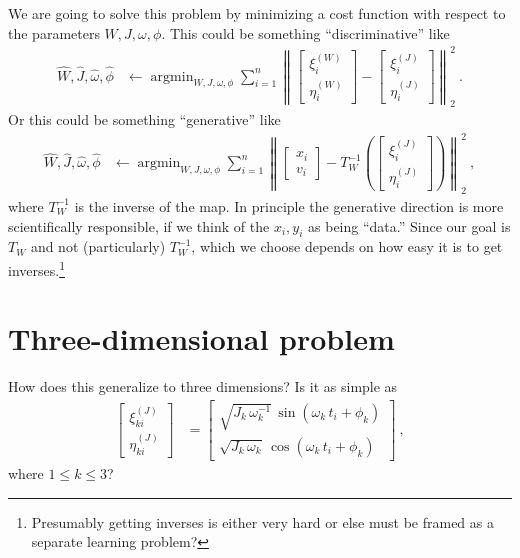 \documentclass{article}
\DeclareMathOperator*{\argmin}{argmin}
\newcommand{\norm}[1]{\left\lVert#1\right\rVert_2^2}
\begin{document}
We are going to solve this problem by minimizing a cost function with respect to the parameters $W,J,\omega,\phi$.
This could be something ``discriminative'' like
\begin{align}
    \hat{W},\hat{J},\hat{\omega},\hat{\phi} &\leftarrow \argmin_{W,J,\omega,\phi} \sum_{i=1}^n\norm{\begin{bmatrix}\xi^{(W)}_i \\ \eta^{(W)}_i\end{bmatrix} - \begin{bmatrix}\xi^{(J)}_i \\ \eta^{(J)}_i\end{bmatrix}} ~.
\end{align}
Or this could be something ``generative'' like
\begin{align}
    \hat{W},\hat{J},\hat{\omega},\hat{\phi} &\leftarrow \argmin_{W,J,\omega,\phi} \sum_{i=1}^n\norm{\begin{bmatrix}x_i \\ v_i\end{bmatrix} - T_W^{-1}(\begin{bmatrix}\xi^{(J)}_i \\ \eta^{(J)}_i\end{bmatrix})} ~,
\end{align}
where $T_W^{-1}$ is the inverse of the map.
In principle the generative direction is more scientifically responsible, if we think of the $x_i, y_i$ as being ``data.''
Since our goal is $T_W$ and not (particularly) $T_W^{-1}$, which we choose depends on how easy it is to get inverses.\footnote{Presumably getting inverses is either very hard or else must be framed as a separate learning problem?}

\section{Three-dimensional problem}
How does this generalize to three dimensions?
Is it as simple as
\begin{align}
    \begin{bmatrix}\xi^{(J)}_{ki} \\ \eta^{(J)}_{ki}\end{bmatrix} &= \begin{bmatrix}\sqrt{J_k\,\omega_k^{-1}}\,\sin(\omega_k\,t_i+\phi_k) \\ \sqrt{J_k\,\omega_k}\,\cos(\omega_k\,t_i+\phi_k)\end{bmatrix} ~,
\end{align}
where $1\leq k\leq 3$?
\end{document}
